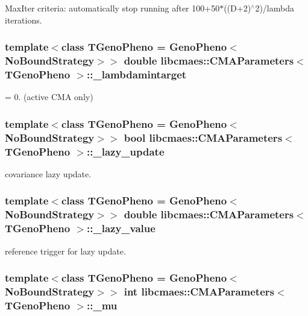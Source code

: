 Max\-Iter criteria\-: automatically stop running after 100+50$\ast$((D+2)$^\wedge$2)/lambda iterations. \hypertarget{classlibcmaes_1_1CMAParameters_afc8800d362e2b25074610b883684156b}{
\subsubsection[{\-\_\-lambdamintarget}]{\setlength{\rightskip}{0pt plus 5cm}template$<$class T\-Geno\-Pheno = Geno\-Pheno$<$\-No\-Bound\-Strategy$>$$>$ double {\bf libcmaes\-::\-C\-M\-A\-Parameters}$<$ T\-Geno\-Pheno $>$\-::\-\_\-lambdamintarget}}\label{classlibcmaes_1_1CMAParameters_afc8800d362e2b25074610b883684156b}
= 0. (active C\-M\-A only) \hypertarget{classlibcmaes_1_1CMAParameters_ac65bf2bb1b20461cfe8bd58175727ccc}{
\subsubsection[{\-\_\-lazy\-\_\-update}]{\setlength{\rightskip}{0pt plus 5cm}template$<$class T\-Geno\-Pheno = Geno\-Pheno$<$\-No\-Bound\-Strategy$>$$>$ bool {\bf libcmaes\-::\-C\-M\-A\-Parameters}$<$ T\-Geno\-Pheno $>$\-::\-\_\-lazy\-\_\-update}}\label{classlibcmaes_1_1CMAParameters_ac65bf2bb1b20461cfe8bd58175727ccc}
covariance lazy update. \hypertarget{classlibcmaes_1_1CMAParameters_ae00e6b49bd99e1aa316bec03da96e95b}{
\subsubsection[{\-\_\-lazy\-\_\-value}]{\setlength{\rightskip}{0pt plus 5cm}template$<$class T\-Geno\-Pheno = Geno\-Pheno$<$\-No\-Bound\-Strategy$>$$>$ double {\bf libcmaes\-::\-C\-M\-A\-Parameters}$<$ T\-Geno\-Pheno $>$\-::\-\_\-lazy\-\_\-value}}\label{classlibcmaes_1_1CMAParameters_ae00e6b49bd99e1aa316bec03da96e95b}
reference trigger for lazy update. \hypertarget{classlibcmaes_1_1CMAParameters_a102a49af5856035c4568178f4847e2e8}{
\subsubsection[{\-\_\-mu}]{\setlength{\rightskip}{0pt plus 5cm}template$<$class T\-Geno\-Pheno = Geno\-Pheno$<$\-No\-Bound\-Strategy$>$$>$ int {\bf libcmaes\-::\-C\-M\-A\-Parameters}$<$ T\-Geno\-Pheno $>$\-::\-\_\-mu}}\label{classlibcmaes_1_1CMAParameters_a102a49af5856035c4568178f4847e2e8}
